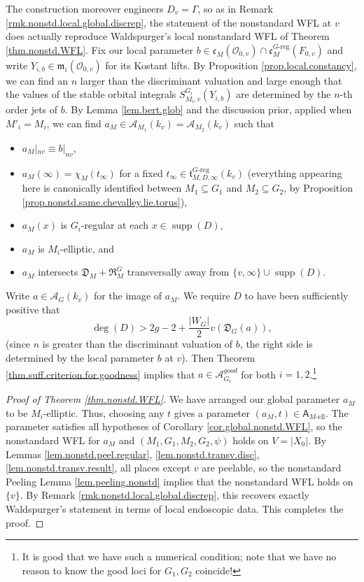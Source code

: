 \documentclass[openany]{amsbook}
\theoremstyle{definition}
\theoremstyle{remark}
\numberwithin{equation}{section}
\renewcommand{\O}{\mathcal{O}}
\newcommand{\cA}{\mathcal{A}}
\renewcommand{\-}{\operatorname{-}}
\newcommand{\on}[1]{\operatorname{#1}}
\newcommand{\good}{\mathit{good}}
\newcommand{\fm}{\mathfrak{m}}
\newcommand{\el}{\text{-ell}}
\newcommand{\bA}{\mathsf{A}}
\newcommand{\bAe}[1]{\bA_{#1\el}}
\newcommand{\ft}{\mathfrak{t}}
\newcommand{\fc}{\mathfrak{c}}
\renewcommand{\fm}{\mathfrak{m}}
\newcommand{\fD}{\mathfrak{D}}
\newcommand{\fR}{\mathfrak{R}}
\newcommand{\Greg}{G\text{-reg}}
\begin{document}
The construction moreover engineers $D_v = \Gamma$, so as in Remark \ref{rmk.nonstd.local.global.discrep}, the statement of the nonstandard WFL at $v$ does actually reproduce Waldspurger's local nonstandard WFL of Theorem \ref{thm.nonstd.WFL}.  
Fix our local parameter $b \in \fc_{M}(\O_{0,v}) \cap \fc_M^{\Greg}(F_{0,v})$ and write $Y_{i,b} \in \fm_i(\O_{0,v})$ for its Kostant lifts. By Proposition \ref{prop.local.constancy}, we can find an $n$ larger than the discriminant valuation and large enough that the values of the stable orbital integrals $S_{M_i,v}^{G_i}(Y_{i,b})$ are determined by the $n$-th order jets of $b$. By Lemma \ref{lem.bert.glob} and the discussion prior, applied when $M'_i = M_i$, we can find $a_M \in \cA_{M_1}(k_v) = \cA_{M_2}(k_v)$ such that
\begin{itemize}
    \item $a_M|_{nv} \equiv b|_{nv}$,
    \item $a_M(\infty) = \chi_M(t_\infty)$ for a fixed $t_\infty \in \ft_{M,D,\infty}^{\Greg}(k_v)$ (everything appearing here is canonically identified between $M_1 \subseteq G_1$ and $M_2 \subseteq G_2$, by Proposition \ref{prop.nonstd.same.chevalley.lie.torus}),
    \item $a_M(x)$ is $G_i$-regular at each $x \in \on{supp}(D)$,
    \item $a_M$ is $M_i$-elliptic, and
    \item $a_M$ intersects $\fD_{M} + \fR_M^G$ transversally away from $\{v, \infty\} \cup \on{supp}(D)$.
\end{itemize}
Write $a \in \cA_G(k_v)$ for the image of $a_M$. We require $D$ to have been sufficiently positive that
$$
    \deg(D) > 2g - 2 + \frac{|W_{G}|}{2} v(\fD_G(a)),
$$
(since $n$ is greater than the discriminant valuation of $b$, the right side is determined by the local parameter $b$ at $v$). Then Theorem \ref{thm.suff.criterion.for.goodness} implies that $a \in \cA_{G_i}^{\good}$ for both $i = 1,2$.\footnote{It is good that we have such a numerical condition; note that we have no reason to know the good loci for $G_1, G_2$ coincide!}

\begin{proof}[Proof of Theorem \ref{thm.nonstd.WFL}]
We have arranged our global parameter $a_M$ to be $M_i$-elliptic. Thus, choosing any $t$ gives a parameter $(a_M, t) \in \bAe{M}$. The parameter satisfies all hypotheses of Corollary \ref{cor.global.nonstd.WFL}, so the nonstandard WFL for $a_M$ and $(M_1, G_1, M_2, G_2, \psi)$ holds on $V = |X_0|$. By Lemmas \ref{lem.nonstd.peel.regular}, \ref{lem.nonstd.transv.disc}, \ref{lem.nonstd.transv.result}, all places except $v$ are peelable, so the nonstandard Peeling Lemma \ref{lem.peeling.nonstd} implies that the nonstandard WFL holds on $\{v\}$. By Remark \ref{rmk.nonstd.local.global.discrep}, this recovers exactly Waldspurger's statement in terms of local endoscopic data. This completes the proof.
\end{proof}

\printbibliography
\end{document}
